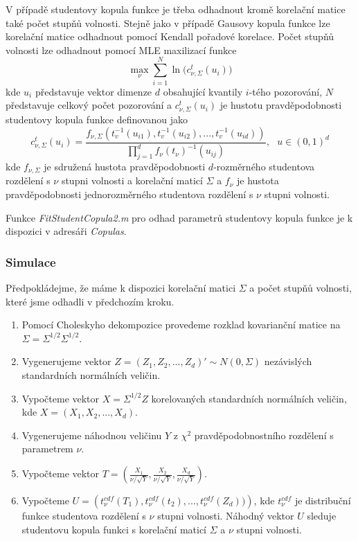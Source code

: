 V případě studentovy kopula funkce je třeba odhadnout kromě korelační matice také počet stupňů volnosti. Stejně jako v případě Gausovy kopula funkce lze korelační matice odhadnout pomocí Kendall pořadové korelace. Počet stupňů volnosti lze odhadnout pomocí MLE maxilizací funkce
\begin{equation*}
\max_{\nu} \sum_{i = 1}^N \ln \Big(c_{\nu, \Sigma}^t(u_i)\Big)
\end{equation*}
kde $u_i$ představuje vektor dimenze $d$ obsahující kvantily $i$-tého pozorování, $N$ představuje celkový počet pozorování a $c_{\nu, \Sigma}^t(u_i)$ je hustotu pravděpodobnosti studentovy kopula funkce definovanou jako
\begin{equation*}
c_{\nu, \Sigma}^t(u_i) = \frac{f_{\nu, \Sigma}(t_{v}^{-1}(u_{i1}), t_{v}^{-1}(u_{i2}), ..., t_{v}^{-1}(u_{id}))}{\prod_{j = 1}^d f_{\nu}(t_{\nu})^{-1}(u_{ij})}, ~~~ u \in (0, 1)^d
\end{equation*}
kde $f_{\nu, \Sigma}$ je sdružená hustota pravděpodobnosti $d$-rozměrného studentova rozdělení s $\nu$ stupni volnosti a korelační maticí $\Sigma$ a $f_{\nu}$ je hustota pravděpodobnosti jednorozměrného studentova rozdělení s $\nu$ stupni volnosti. 

Funkce \textit{FitStudentCopula2.m} pro odhad parametrů studentovy kopula funkce je k dispozici v adresáři \textit{Copulas}.

\subsubsection{Simulace}

Předpokládejme, že máme k dispozici korelační matici $\Sigma$ a počet stupňů volnosti, které jsme odhadli v předchozím kroku.

\begin{enumerate}
\item Pomocí Choleskyho dekompozice provedeme rozklad kovarianční matice na $\Sigma = \Sigma^{1/2} \Sigma^{1/2}$.
\item Vygenerujeme vektor $Z = (Z_1, Z_2, ..., Z_d)' \sim N(0, \Sigma)$ nezávislých standardních normálních veličin.
\item Vypočteme vektor $X = \Sigma^{1/2}Z$ korelovaných standardních normálních veličin, kde $X = (X_1, X_2, ..., X_d)$.
\item Vygenerujeme náhodnou veličinu $Y$ z $\chi^2$ pravděpodobnostního rozdělení s parametrem $\nu$.
\item Vypočteme vektor $T = \left( \frac{X_1}{\nu / \sqrt{Y}}, \frac{X_2}{\nu / \sqrt{Y}}, \frac{X_d}{\nu / \sqrt{Y}} \right)$.
\item Vypočteme $U = \left(t_{\nu}^{cdf}(T_1), t_{\nu}^{cdf}(t_2), ...,  t_{\nu}^{cdf}(Z_d)) \right)$, kde $t_{\nu}^{cdf}$ je distribuční funkce studentova rozdělení s $\nu$ stupni volnosti. Náhodný vektor $U$ sleduje studentovu kopula funkci s korelační maticí $\Sigma$ a $\nu$ stupni volnosti.
\end{enumerate}

